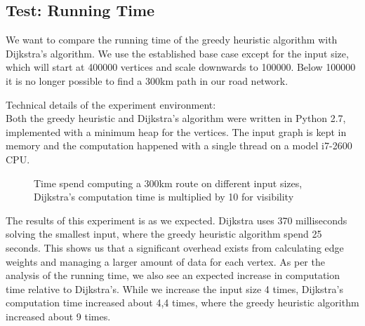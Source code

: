 \subsection{Test: Running Time}
We want to compare the running time of the greedy heuristic algorithm with Dijkstra's algorithm. We use the established base case except for the input size, which will start at 400000 vertices and scale downwards to 100000. Below 100000 it is no longer possible to find a 300km path in our road network.

Technical details of the experiment environment:\\
Both the greedy heuristic and Dijkstra's algorithm were written in Python 2.7, implemented with a minimum heap for the vertices. The input graph is kept in memory and the computation happened with a single thread on a model i7-2600 CPU.
\begin{figure}[!htb]
\centering
{}
\caption{Time spend computing a 300km route on different input sizes, Dijkstra's computation time is multiplied by 10 for visibility} 
\label{fig:time_comp}
\end{figure}

The results of this experiment is as we expected. Dijkstra uses 370 milliseconds solving the smallest input, where the greedy heuristic algorithm spend 25 seconds. This shows us that a significant overhead exists from calculating edge weights and managing a larger amount of data for each vertex. As per the analysis of the running time, we also see an expected increase in computation time relative to Dijkstra's. While we increase the input size 4 times, Dijkstra's computation time increased about 4,4 times, where the greedy heuristic algorithm increased about 9 times.